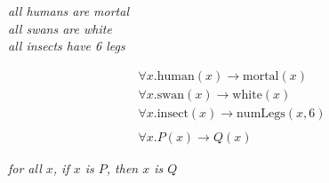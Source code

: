\documentclass[xetex,aspectratio=169,14pt,hyperref={pdfpagelabels=true,pdflang={en-GB}}]{beamer}
\begin{document}
\begin{frame}[t]

  \begin{center}
    \emph{all humans are mortal} \\
    \emph{all swans are white} \\
    \emph{all insects have 6 legs}
  \end{center}

  \begin{displaymath}
    \begin{array}{c}
      \forall x. \mathrm{human}(x) \to \mathrm{mortal}(x) \\
      \forall x. \mathrm{swan}(x) \to \mathrm{white}(x) \\
      \forall x. \mathrm{insect}(x) \to \mathrm{numLegs}(x,6) \\
      \\
      \forall x. P(x) \to Q(x)
    \end{array}
  \end{displaymath}

  \begin{center}
    \emph{for all $x$, if $x$ is $P$, then $x$ is $Q$}
  \end{center}
\end{frame}





\end{document}
